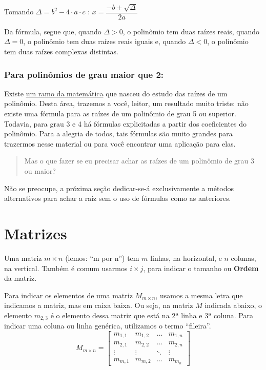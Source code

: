 \documentclass[
  portuguese,
  letterpaper,
  DIV=11,
  numbers=noendperiod]{scrreport}
\begin{document}
Tomando \(\Delta = b^2-4 \cdot a \cdot c\) :
\(x=\dfrac{-b \pm \sqrt{\Delta}}{2a}\)

Da fórmula, segue que, quando \(\Delta>0\), o polinômio tem duas raízes
reais, quando \(\Delta=0\), o polinômio tem duas raízes reais iguais e,
quando \(\Delta<0\), o polinômio tem duas raízes complexas distintas.

\subsection{Para polinômios de grau maior que
2:}\label{para-polinuxf4mios-de-grau-maior-que-2}

Existe \href{https://en.wikipedia.org/wiki/Galois_theory}{um ramo da
matemática} que nasceu do estudo das raízes de um polinômio. Desta área,
trazemos a você, leitor, um resultado muito triste: não existe uma
fórmula para as raízes de um polinômio de grau 5 ou superior. Todavia,
para grau 3 e 4 há fórmulas explicitadas a partir dos coeficientes do
polinômio. Para a alegria de todos, tais fórmulas são muito grandes para
trazermos nesse material ou para você encontrar uma aplicação para elas.

\begin{quote}
Mas o que fazer se eu precisar achar as raízes de um polinômio de grau 3
ou maior?
\end{quote}

Não se preocupe, a próxima seção dedicar-se-á exclusivamente a métodos
alternativos para achar a raiz sem o uso de fórmulas como as anteriores.

\chapter{Matrizes}\label{matrizes}

Uma matriz \(m \times n\) (lemos: ``m por n'') tem \(m\) linhas, na
horizontal, e \(n\) colunas, na vertical. Também é comum usarmos
\(i \times j\), para indicar o tamanho ou \textbf{Ordem} da matriz.

Para indicar os elementos de uma matriz \(M_{m\times n}\), usamos a
mesma letra que indicamos a matriz, mas em caixa baixa. Ou seja, na
matriz \(M\) indicada abaixo, o elemento \(m_{2,3}\) é o elemento dessa
matriz que está na 2ª linha e 3ª coluna. Para indicar uma coluna ou
linha genérica, utilizamos o termo ``fileira''. \[
M_{m\times n}=
\begin{bmatrix}
    m_{1,1} & m_{1,2} & \dots & m_{1,n} \\
    m_{2,1} & m_{2,2} & \dots & m_{2,n} \\
    \vdots  & \vdots & \ddots & \vdots \\
    m_{m,1} & m_{m,2} & \dots & m_{m_n}
\end{bmatrix}
\]
\end{document}
